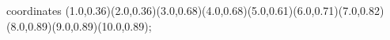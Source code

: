 					coordinates { (1.0,0.36)(2.0,0.36)(3.0,0.68)(4.0,0.68)(5.0,0.61)(6.0,0.71)(7.0,0.82)(8.0,0.89)(9.0,0.89)(10.0,0.89)};
